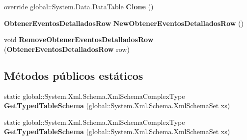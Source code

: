 \begin{DoxyCompactItemize}
\item 
override global\+::\+System.\+Data.\+Data\+Table {\bfseries Clone} ()\label{class_resa___pro_1_1_resa_d_b_data_set_1_1_obtener_eventos_detallados_data_table_ae9642f6af12f7189be4d344f5cb4dce1}

\item 
{\bf Obtener\+Eventos\+Detallados\+Row} {\bfseries New\+Obtener\+Eventos\+Detallados\+Row} ()\label{class_resa___pro_1_1_resa_d_b_data_set_1_1_obtener_eventos_detallados_data_table_a31dc7ef15b8728b9bada4e8f76faa34d}

\item 
void {\bfseries Remove\+Obtener\+Eventos\+Detallados\+Row} ({\bf Obtener\+Eventos\+Detallados\+Row} row)\label{class_resa___pro_1_1_resa_d_b_data_set_1_1_obtener_eventos_detallados_data_table_ac310860831093b380da2193a991dc9a7}

\end{DoxyCompactItemize}
\subsection*{Métodos públicos estáticos}
\begin{DoxyCompactItemize}
\item 
static global\+::\+System.\+Xml.\+Schema.\+Xml\+Schema\+Complex\+Type {\bfseries Get\+Typed\+Table\+Schema} (global\+::\+System.\+Xml.\+Schema.\+Xml\+Schema\+Set xs)\label{class_resa___pro_1_1_resa_d_b_data_set_1_1_obtener_eventos_detallados_data_table_a78406bdb9aa0f9c051d4551cd1179ae2}

\item 
static global\+::\+System.\+Xml.\+Schema.\+Xml\+Schema\+Complex\+Type {\bfseries Get\+Typed\+Table\+Schema} (global\+::\+System.\+Xml.\+Schema.\+Xml\+Schema\+Set xs)\label{class_resa___pro_1_1_resa_d_b_data_set_1_1_obtener_eventos_detallados_data_table_a78406bdb9aa0f9c051d4551cd1179ae2}

\end{DoxyCompactItemize}
